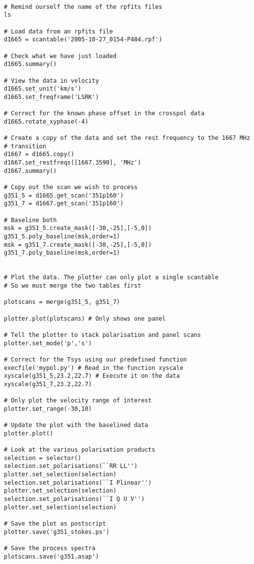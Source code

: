 \documentclass[11pt]{article}
\begin{document}
\begin{verbatim}

# Remind ourself the name of the rpfits files
ls

# Load data from an rpfits file
d1665 = scantable('2005-10-27_0154-P484.rpf')

# Check what we have just loaded
d1665.summary()

# View the data in velocity
d1665.set_unit('km/s')
d1665.set_freqframe('LSRK')

# Correct for the known phase offset in the crosspol data
d1665.rotate_xyphase(-4)

# Create a copy of the data and set the rest frequency to the 1667 MHz
# transition
d1667 = d1665.copy()
d1667.set_restfreqs([1667.3590], 'MHz')
d1667.summary()

# Copy out the scan we wish to process
g351_5 = d1665.get_scan('351p160')
g351_7 = d1667.get_scan('351p160')

# Baseline both
msk = g351_5.create_mask([-30,-25],[-5,0])
g351_5.poly_baseline(msk,order=1)
msk = g351_7.create_mask([-30,-25],[-5,0])
g351_7.poly_baseline(msk,order=1)


# Plot the data. The plotter can only plot a single scantable
# So we must merge the two tables first

plotscans = merge(g351_5, g351_7)

plotter.plot(plotscans) # Only shows one panel

# Tell the plotter to stack polarisation and panel scans
plotter.set_mode('p','s')

# Correct for the Tsys using our predefined function
execfile('mypol.py') # Read in the function xyscale
xyscale(g351_5,23.2,22.7) # Execute it on the data
xyscale(g351_7,23.2,22.7)

# Only plot the velocity range of interest
plotter.set_range(-30,10)

# Update the plot with the baselined data
plotter.plot()

# Look at the various polarisation products
selection = selector()
selection.set_polarisations(``RR LL'')
plotter.set_selection(selection)
selection.set_polarisations(``I Plinear'')
plotter.set_selection(selection)
selection.set_polarisations(``I Q U V'')
plotter.set_selection(selection)

# Save the plot as postscript
plotter.save('g351_stokes.ps')

# Save the process spectra
plotscans.save('g351.asap')

\end{verbatim}
\end{document}
